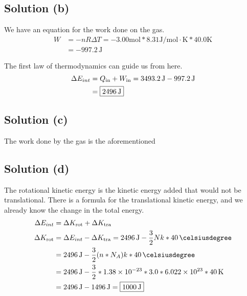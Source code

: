 \documentclass[12pt]{article}
\newcommand{\E}[1]{\times 10^{#1}}
\begin{document}
        \subsection{Solution (b)}
            We have an equation for the work done on the gas.
            \begin{align}
                W   &=  -nR\Delta T
                    =   -3.00\unit{\mole} * 8.31\unit{\joule/\mole\cdot\kelvin} * 40.0\unit{\kelvin}\\
                    &=  -997.2\,\unit{\joule}
            \end{align}

            The first law of thermodynamics can guide us from here.
            \begin{align}
                \Delta E_{int}  &=  Q_{\rm in} + W_{\rm in}
                    =   3493.2\,\unit{\joule} - 997.2\,\unit{\joule}\\
                    &=  \boxed{2496\,\unit{\joule}}
            \end{align}
        
        \subsection{Solution (c)}
            The work done by the gas is the aforementioned 

        \subsection{Solution (d)}
            The rotational kinetic energy is the kinetic energy added that would not be translational.
            There is a formula for the translational kinetic energy, and we already know the change in the total energy.
            \begin{align}
                \Delta E_{int}  &=  \Delta K_{\rm rot} + \Delta K_{\rm tra}\\
                \Delta K_{\rm rot}  &=  \Delta E_{int} - \Delta K_{\rm tra}
                    =   2496\,\unit{\joule} - \frac{3}{2}Nk*40\,\unit{\celsiusdegree}\\
                    &=  2496\,\unit{\joule} - \frac{3}{2}(n*N_A)k*40\,\unit{\celsiusdegree}\\
                    &=  2496\,\unit{\joule} - \frac{3}{2} * 1.38\E{-23} * 3.0 * 6.022\E{23} * 40\,\unit{\kelvin}\\
                    &=  2496\,\unit{\joule} - 1496\,\unit{\joule}
                    =   \boxed{1000\,\unit{\joule}}
            \end{align}
            
\end{document}
